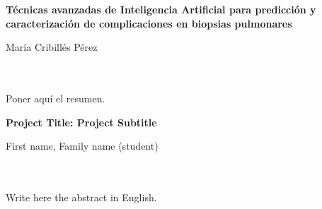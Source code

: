 \chapter*{}






\cleardoublepage
\thispagestyle{empty}

\begin{center}
{\large\bfseries Técnicas avanzadas de Inteligencia Artificial para predicción y caracterización de complicaciones en biopsias pulmonares}\\
\end{center}
\begin{center}
María Cribillés Pérez\\
\end{center}

\\

\vspace{0.7cm}
\\

Poner aquí el resumen.
\cleardoublepage


\thispagestyle{empty}


\begin{center}
{\large\bfseries Project Title: Project Subtitle}\\
\end{center}
\begin{center}
First name, Family name (student)\\
\end{center}

\\

\vspace{0.7cm}
\\

Write here the abstract in English.

\chapter*{}
\thispagestyle{empty}

